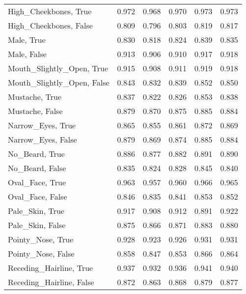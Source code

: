 \begin{tabular}{lrrrrr}
     High\_Cheekbones, True &   0.972 &        0.968 &         0.970 &     0.973 &     0.973 \\
    High\_Cheekbones, False &   0.809 &        0.796 &         0.803 &     0.819 &     0.817 \\
                Male, True &   0.830 &        0.818 &         0.824 &     0.839 &     0.835 \\
               Male, False &   0.913 &        0.906 &         0.910 &     0.917 &     0.918 \\
 Mouth\_Slightly\_Open, True &   0.915 &        0.908 &         0.911 &     0.919 &     0.918 \\
Mouth\_Slightly\_Open, False &   0.843 &        0.832 &         0.839 &     0.852 &     0.850 \\
            Mustache, True &   0.837 &        0.822 &         0.826 &     0.853 &     0.838 \\
           Mustache, False &   0.879 &        0.870 &         0.875 &     0.885 &     0.884 \\
         Narrow\_Eyes, True &   0.865 &        0.855 &         0.861 &     0.872 &     0.869 \\
        Narrow\_Eyes, False &   0.879 &        0.869 &         0.874 &     0.885 &     0.884 \\
            No\_Beard, True &   0.886 &        0.877 &         0.882 &     0.891 &     0.890 \\
           No\_Beard, False &   0.835 &        0.824 &         0.828 &     0.845 &     0.840 \\
           Oval\_Face, True &   0.963 &        0.957 &         0.960 &     0.966 &     0.965 \\
          Oval\_Face, False &   0.846 &        0.835 &         0.841 &     0.853 &     0.852 \\
           Pale\_Skin, True &   0.917 &        0.908 &         0.912 &     0.891 &     0.922 \\
          Pale\_Skin, False &   0.875 &        0.866 &         0.871 &     0.883 &     0.880 \\
         Pointy\_Nose, True &   0.928 &        0.923 &         0.926 &     0.931 &     0.931 \\
        Pointy\_Nose, False &   0.858 &        0.847 &         0.853 &     0.866 &     0.864 \\
   Receding\_Hairline, True &   0.937 &        0.932 &         0.936 &     0.941 &     0.940 \\
  Receding\_Hairline, False &   0.872 &        0.863 &         0.868 &     0.879 &     0.877 \\

\end{tabular}
